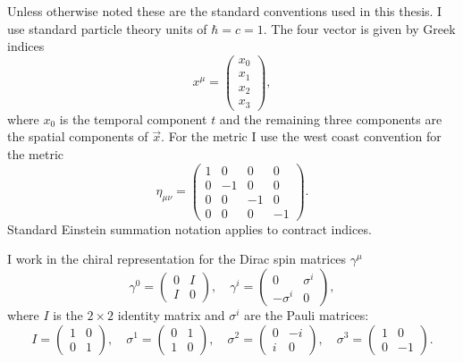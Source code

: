 
Unless otherwise noted these are the standard conventions used in this thesis.
I use standard particle theory units of $\hbar=c=1$.
The four vector is given by Greek indices
\begin{equation}
  x^\mu=\left(\begin{matrix} x_0 \\ x_1 \\ x_2 \\ x_3\end{matrix}\right),
\end{equation}
where $x_0$ is the temporal component $t$ and the remaining three components are the spatial components of $\vec x$.
For the metric I use the west coast convention for the metric
\begin{equation}
  \eta_{\mu\nu} = \left(\begin{matrix}1& 0 & 0 & 0 \\
                                      0&-1 & 0 & 0 \\
                                      0& 0 &-1 & 0 \\
                                      0& 0 & 0 &-1\end{matrix}\right).
\end{equation}
Standard Einstein summation notation applies to contract indices.

I work in the chiral representation for the Dirac spin matrices $\gamma^\mu$
\begin{equation}
  \gamma^0=\left(\begin{matrix}0 & I \\ I & 0\end{matrix}\right),\quad\gamma^i=\left(\begin{matrix}0 & \sigma^i \\ -\sigma^i & 0 \end{matrix}\right),
\end{equation}
where $I$ is the $2\times 2$ identity matrix and $\sigma^i$ are the Pauli matrices:
\begin{equation}
  I=\left(\begin{matrix}1 & 0 \\ 0 & 1\end{matrix}\right),\quad\sigma^1=\left(\begin{matrix}0 & 1 \\ 1 & 0\end{matrix}\right),\quad\sigma^2=\left(\begin{matrix}0 & -i \\ i & 0\end{matrix}\right),\quad\sigma^3=\left(\begin{matrix}1 & 0 \\ 0 & -1\end{matrix}\right).
\end{equation}

